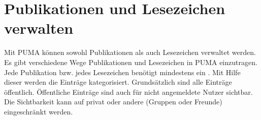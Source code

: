 \section{Publikationen und Lesezeichen verwalten}
\label{sec:publikationen}
 Mit PUMA können sowohl Publikationen als auch Lesezeichen verwaltet werden. Es gibt verschiedene Wege Publikationen und Lesezeichen in PUMA einzutragen. Jede Publikation bzw. jedes Lesezeichen benötigt mindestens ein \tag. Mit Hilfe dieser \tags  werden die Einträge kategorisiert. Grundsätzlich sind alle Einträge öffentlich. Öffentliche Einträge sind auch für nicht angemeldete Nutzer sichtbar. Die Sichtbarkeit kann auf privat oder andere (Gruppen oder Freunde) eingeschränkt werden. 
